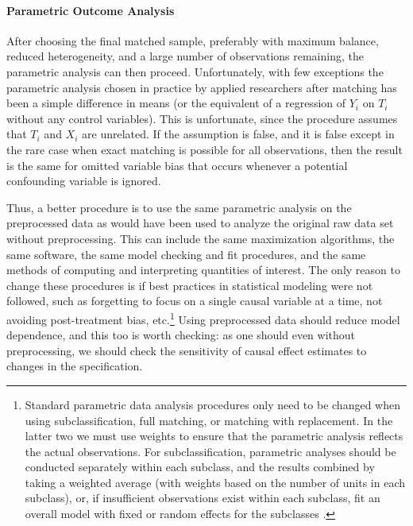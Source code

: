 \documentclass[11pt,titlepage]{article}
\begin{document}

\paragraph{Parametric Outcome Analysis}  
After choosing the final matched sample, preferably with maximum
balance, reduced heterogeneity, and a large number of observations
remaining, the parametric analysis can then proceed.  Unfortunately,
with few exceptions the parametric analysis chosen in practice by
applied researchers after matching has been a simple difference in
means (or the equivalent of a regression of $Y_i$ on $T_i$ without any
control variables).  This is unfortunate, since the procedure assumes
that $T_i$ and $X_i$ are unrelated.  If the assumption is false, and
it is false except in the rare case when exact matching is possible
for all observations, then the result is the same for omitted variable
bias that occurs whenever a potential confounding variable is ignored.

Thus, a better procedure is to use the same parametric analysis on the
preprocessed data as would have been used to analyze the original raw
data set without preprocessing.  This can include the same
maximization algorithms, the same software, the same model checking
and fit procedures, and the same methods of computing and interpreting
quantities of interest.  The only reason to change these procedures is
if best practices in statistical modeling were not followed, such as
forgetting to focus on a single causal variable at a time, not
avoiding post-treatment bias, etc.\footnote{Standard parametric data
  analysis procedures only need to be changed when using
  subclassification, full matching, or matching with replacement.  In
  the latter two we must use weights to ensure that the parametric
  analysis reflects the actual observations.  For subclassification,
  parametric analyses should be conducted separately within each
  subclass, and the results combined by taking a weighted average
  (with weights based on the number of units in each subclass), or, if
  insufficient observations exist within each subclass, fit an overall
  model with fixed or random effects for the subclasses
  \citep{ImaDyk04}.}  Using preprocessed data should reduce model
dependence, and this too is worth checking: as one should even without
preprocessing, we should check the sensitivity of causal effect
estimates to changes in the specification.
\end{document}
